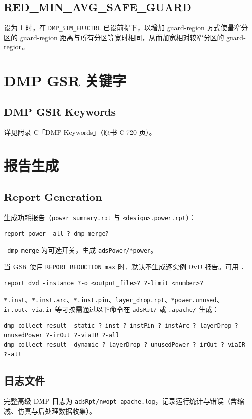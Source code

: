 \subsection{RED\_MIN\_AVG\_SAFE\_GUARD}
设为 1 时，在 \texttt{DMP\_SIM\_ERRCTRL} 已设前提下，以增加 guard-region 方式使最窄分区的 guard-region 距离与所有分区等宽时相同，从而加宽相对较窄分区的 guard-region。

\section{DMP GSR 关键字}
\subsection*{DMP GSR Keywords}

详见附录 C「DMP Keywords」（原书 C-720 页）。

\section{报告生成}
\subsection*{Report Generation}

生成功耗报告（\texttt{power\_summary.rpt} 与 \texttt{<design>.power.rpt}）：
\begin{lstlisting}
report power -all ?-dmp_merge?
\end{lstlisting}
\texttt{-dmp\_merge} 为可选开关，生成 \texttt{adsPower/*power}。

当 GSR 使用 \texttt{REPORT REDUCTION max} 时，默认不生成逐实例 DvD 报告。可用：
\begin{lstlisting}
report dvd -instance ?-o <output_file>? ?-limit <number>?
\end{lstlisting}

\texttt{*.inst}、\texttt{*.inst.arc}、\texttt{*.inst.pin}、\texttt{layer\_drop.rpt}、\texttt{*power.unused}、\texttt{ir.out}、\texttt{via.ir} 等可按需通过以下命令在 \texttt{adsRpt/} 或 \texttt{.apache/} 生成：
\begin{lstlisting}
dmp_collect_result -static ?-inst ?-instPin ?-instArc ?-layerDrop ?-unusedPower ?-irOut ?-viaIR ?-all
dmp_collect_result -dynamic ?-layerDrop ?-unusedPower ?-irOut ?-viaIR ?-all
\end{lstlisting}

\subsection{日志文件}
完整高级 DMP 日志为 \texttt{adsRpt/nwopt\_apache.log}，记录运行统计与错误（含缩减、仿真与后处理数据收集）。

